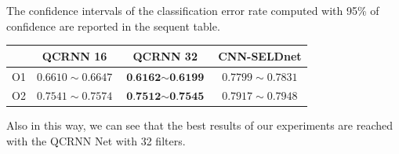 \documentclass{article}
\begin{document}
The confidence intervals of the classification error rate computed with 95\% of confidence are reported in the sequent table.\\
\FloatBarrier
\begin{table}[h!]
\centering
\begin{tabular}{c|c|c|c}
& QCRNN 16 & QCRNN 32 & CNN-SELDnet \\
\hline
O1 & $0.6610\sim 0.6647$ & $\textbf{0.6162}\sim \textbf{0.6199}$ & $0.7799\sim 0.7831$\\
\hline
O2 & $0.7541\sim 0.7574$& $\textbf{0.7512}\sim \textbf{0.7545}$& $0.7917\sim 0.7948$\\
\end{tabular}
\end{table}
\FloatBarrier
Also in this way, we can see that the best results of our experiments are reached with the QCRNN Net with 32 filters.

    
\end{document}

